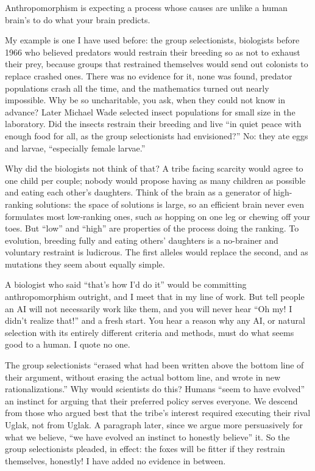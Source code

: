 
Anthropomorphism is expecting a process whose causes are unlike a human brain's to do what your brain predicts.

My example is one I have used before: the group selectionists, biologists before 1966 who believed predators would restrain their breeding so as not to exhaust their prey, because groups that restrained themselves would send out colonists to replace crashed ones. There was no evidence for it, none was found, predator populations crash all the time, and the mathematics turned out nearly impossible. Why be so uncharitable, you ask, when they could not know in advance? Later Michael Wade selected insect populations for small size in the laboratory. Did the insects restrain their breeding and live ``in quiet peace with enough food for all, as the group selectionists had envisioned?'' No: they ate eggs and larvae, ``especially female larvae.'' 

Why did the biologists not think of that? A tribe facing scarcity would agree to one child per couple; nobody would propose having as many children as possible and eating each other's daughters. Think of the brain as a generator of high-ranking solutions: the space of solutions is large, so an efficient brain never even formulates most low-ranking ones, such as hopping on one leg or chewing off your toes. But ``low'' and ``high'' are properties of the process doing the ranking. To evolution, breeding fully and eating others' daughters is a no-brainer and voluntary restraint is ludicrous. The first alleles would replace the second, and as mutations they seem about equally simple.

A biologist who said ``that's how I'd do it'' would be committing anthropomorphism outright, and I meet that in my line of work. But tell people an AI will not necessarily work like them, and you will never hear ``Oh my! I didn't realize that!'' and a fresh start. You hear a reason why any AI, or natural selection with its entirely different criteria and methods, must do what seems good to a human. I quote no one.

The group selectionists ``erased what had been written above the bottom line of their argument, without erasing the actual bottom line, and wrote in new rationalizations.''  Why would scientists do this? Humans ``seem to have evolved'' an instinct for arguing that their preferred policy serves everyone. We descend from those who argued best that the tribe's interest required executing their rival Uglak, not from Uglak. A paragraph later, since we argue more persuasively for what we believe, ``we have evolved an instinct to honestly believe'' it. So the group selectionists pleaded, in effect: the foxes will be fitter if they restrain themselves, honestly! I have added no evidence in between.

